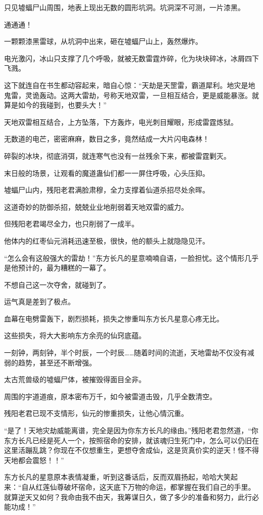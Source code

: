 \begin{this_body}
只见墟蝠尸山周围，地表上现出无数的圆形坑洞。坑洞深不可测，一片漆黑。

通通通！

一颗颗漆黑雷球，从坑洞中出来，砸在墟蝠尸山上，轰然爆炸。

电光激闪，冰山只支撑了几个呼吸，就被无数雷霆炸碎，化为块块碎冰，冰屑四下飞溅。

这下就连自在书生都动容起来，暗自心惊：“天劫是天罡雷，霸道犀利。地灾是地鬼雷，灵诡轰动。这两大雷劫，号称天地双雷，一旦相互结合，更是威能暴涨。就算是如今的我碰到，也要头大！”

天地双雷相互结合，上方坠落，下方轰炸，电光刺目耀眼，形成雷霆炼狱。

无数道的电芒，密密麻麻，数目之多，竟然结成一大片闪电森林！

碎裂的冰块，彻底消弭，就连寒气也没有一丝残余下来，都被雷霆剿灭。

末日般的场景，让观看的魔道蛊仙们都一一屏住呼吸，心头压抑。

墟蝠尸山内，残阳老君满脸肃穆，全力支撑着仙道杀招尽处余晖。

这道奇妙的防御杀招，兢兢业业地削弱着天地双雷的威力。

但残阳老君竭尽全力，也只削弱了一成半。

他体内的红枣仙元消耗迅速至极，很快，他的额头上就隐隐见汗。

“怎么会有这般强大的雷劫！”东方长凡的星意喃喃自语，一脸担忧。这个情形几乎是他预计的，最为糟糕的一幕了。

不想自己这一次夺舍，就碰到了。

运气真是差到了极点。

血幕在电劈雷轰下，剧烈损耗，损失之惨重叫东方长凡星意心疼无比。

这些损失，将大大影响东方余亮的仙窍底蕴。

一刻钟，两刻钟，半个时辰，一个时辰……随着时间的流逝，天地雷劫不仅没有减弱的趋势，甚至还不断增强。

太古荒兽级的墟蝠尸体，被摧毁得面目全非。

周围的宇道道痕，原本密布万千，如今被雷道击毁，几乎全数清空。

残阳老君已现不支情形，仙元的惨重损失，让他心情沉重。

“是了！天地灾劫威能离谱，完全是因为你东方长凡的缘由。”残阳老君忽然道，“你东方长凡已经是死人一个，按照宿命的安排，就该魂归生死门中，怎么可以仍旧在这里活蹦乱跳？你现在不仅想重生，更想夺舍成仙，这是货真价实的逆天！怪不得天地都会震怒！！”

东方长凡的星意原本表情凝重，听到这番话后，反而双眉扬起，哈哈大笑起来：“自从红莲仙尊破坏宿命，这天底下万物的命运，都掌握在我们自己的手里。就算逆天又如何？我命由我不由天，我筹谋日久，做了多少的准备和努力，此行必能功成！”


\end{this_body}
